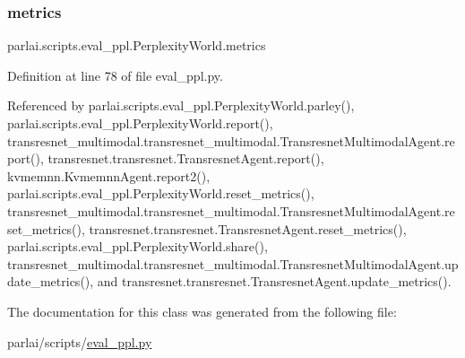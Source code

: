 \mbox{\label{classparlai_1_1scripts_1_1eval__ppl_1_1PerplexityWorld_a22875b8c503fb611cb253c69f88a2a31}} 
\subsubsection{\texorpdfstring{metrics}{metrics}}
{\footnotesize\ttfamily parlai.\+scripts.\+eval\+\_\+ppl.\+Perplexity\+World.\+metrics}



Definition at line 78 of file eval\+\_\+ppl.\+py.



Referenced by parlai.\+scripts.\+eval\+\_\+ppl.\+Perplexity\+World.\+parley(), parlai.\+scripts.\+eval\+\_\+ppl.\+Perplexity\+World.\+report(), transresnet\+\_\+multimodal.\+transresnet\+\_\+multimodal.\+Transresnet\+Multimodal\+Agent.\+report(), transresnet.\+transresnet.\+Transresnet\+Agent.\+report(), kvmemnn.\+Kvmemnn\+Agent.\+report2(), parlai.\+scripts.\+eval\+\_\+ppl.\+Perplexity\+World.\+reset\+\_\+metrics(), transresnet\+\_\+multimodal.\+transresnet\+\_\+multimodal.\+Transresnet\+Multimodal\+Agent.\+reset\+\_\+metrics(), transresnet.\+transresnet.\+Transresnet\+Agent.\+reset\+\_\+metrics(), parlai.\+scripts.\+eval\+\_\+ppl.\+Perplexity\+World.\+share(), transresnet\+\_\+multimodal.\+transresnet\+\_\+multimodal.\+Transresnet\+Multimodal\+Agent.\+update\+\_\+metrics(), and transresnet.\+transresnet.\+Transresnet\+Agent.\+update\+\_\+metrics().



The documentation for this class was generated from the following file\+:\begin{DoxyCompactItemize}
\item 
parlai/scripts/\hyperlink{parlai_2scripts_2eval__ppl_8py}{eval\+\_\+ppl.\+py}\end{DoxyCompactItemize}
